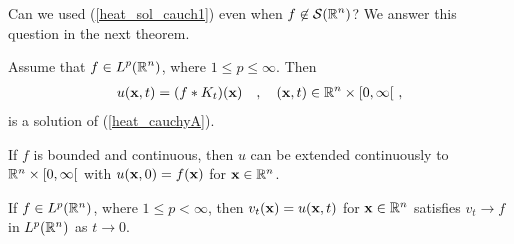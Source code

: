 Can we used (\ref{heat_sol_cauch1}) even when
$\displaystyle f\not\in \mathcal{S}(\mathbb{R}^n)$?
We answer this question in the next theorem.

\begin{theorem} \label{heat_solution_hs}
Assume that $\displaystyle f \in L^p(\mathbb{R}^n)$, where $1\leq p \leq \infty$.  Then
\begin{align} \label{heat_sol_cauch}
u(\mathbf{x},t) = (f \ast K_t)(\mathbf{x}) \quad , \quad
(\mathbf{x},t) \in \mathbb{R}^n \times [0,\infty[ \  , 
\end{align}
is a solution of (\ref{heat_cauchyA}).

If $f$ is bounded and continuous, then $u$ can be extended
continuously to $\mathbb{R}^n \times [0,\infty[$ with
$u(\mathbf{x},0) = f(\mathbf{x})$ for $\mathbf{x} \in \mathbb{R}^n$.

If $f \in L^p(\mathbb{R}^n)$, where $1\leq p < \infty$, then
$v_t(\mathbf{x}) = u(\mathbf{x},t)$ for $\mathbf{x} \in \mathbb{R}^n$ satisfies
$v_t \rightarrow f$ in $L^p(\mathbb{R}^n)$ as $t\rightarrow 0$.
\end{theorem}

